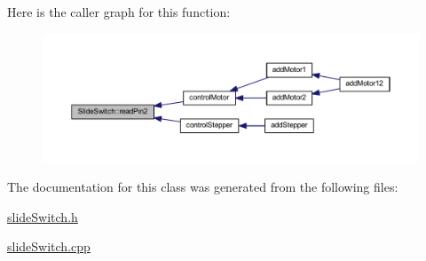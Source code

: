 Here is the caller graph for this function\+:
\nopagebreak
\begin{figure}[H]
\begin{center}
\leavevmode
\includegraphics[width=350pt]{d3/d09/class_slide_switch_ada186df3375d7dcd7dac6470c9832830_icgraph}
\end{center}
\end{figure}


The documentation for this class was generated from the following files\+:\begin{DoxyCompactItemize}
\item 
\hyperlink{slide_switch_8h}{slide\+Switch.\+h}\item 
\hyperlink{slide_switch_8cpp}{slide\+Switch.\+cpp}\end{DoxyCompactItemize}
